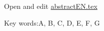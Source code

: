 \begin{abstractEN}

Open and edit \href{run:./abstractEN.tex}{abstractEN.tex}

Key words:A, B, C, D, E, F, G

\end{abstractEN}
